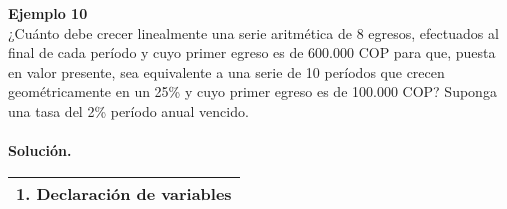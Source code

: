\textbf{Ejemplo 10}\\
¿Cuánto debe crecer linealmente una serie
aritmética de 8 egresos, efectuados al final de cada período y cuyo primer egreso es de 600.000 COP para
que, puesta en valor presente, sea equivalente a una serie de 10 períodos que crecen
geométricamente en un 25\% y cuyo primer egreso es de  100.000 COP? Suponga una tasa del 2\% período
anual vencido.\\ \\
\textbf{Solución.}\\
\begin{center}
  \renewcommand{\arraystretch}{1.5}%
  \begin{longtable}[H]{|p{0.5\linewidth}|p{0.5\linewidth}|}
    \hline
    \multicolumn{2}{|c|}{\cellcolor[HTML]{FFB183}\textbf{1. Declaración de variables}}                 \\ \hline


\end{longtable}
\end{center}
